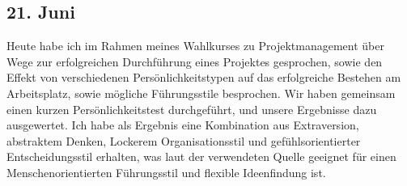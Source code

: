 \subsection{21. Juni}
Heute habe ich im Rahmen meines Wahlkurses zu Projektmanagement über Wege zur erfolgreichen Durchführung eines Projektes gesprochen, sowie den Effekt von verschiedenen Persönlichkeitstypen auf das erfolgreiche Bestehen am Arbeitsplatz, sowie mögliche Führungsstile besprochen. Wir haben gemeinsam einen kurzen Persönlichkeitstest durchgeführt, und unsere Ergebnisse dazu ausgewertet. Ich habe als Ergebnis eine Kombination aus Extraversion, abstraktem Denken, Lockerem Organisationsstil und gefühlsorientierter Entscheidungsstil erhalten, was laut der verwendeten Quelle geeignet für einen Menschenorientierten Führungsstil und flexible Ideenfindung ist.